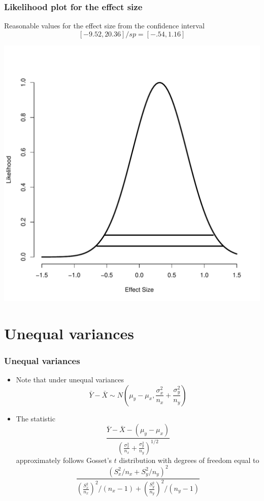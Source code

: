 \documentclass[aspectratio=169]{beamer}
\begin{document}
\begin{frame}\frametitle{Likelihood plot for the effect size}
Reasonable values for the effect size from the confidence interval
$$
[-9.52, 20.36] / sp = [-.54, 1.16]
$$
\begin{center}
\includegraphics[scale=.3]{Lecture10ESlikelihood.pdf}
\end{center}
\end{frame}


\section{Unequal variances}
\begin{frame}\frametitle{Unequal variances}
  \begin{itemize}
  \item Note that under unequal variances
    $$
    \bar Y - \bar X \sim N\left(\mu_y - \mu_x, \frac{\sigma_x^2}{n_x} + \frac{\sigma_y^2}{n_y}\right)
    $$
  \item The statistic 
    $$
    \frac{\bar Y - \bar X - (\mu_y - \mu_x)}{\left(\frac{\sigma_x^2}{n_x} + \frac{\sigma_y^2}{n_y}\right)^{1/2}}
    $$
    approximately follows Gosset's $t$ distribution with degrees of freedom equal to
    $$
    \frac{\left(S_x^2 / n_x + S_y^2/n_y\right)^2}
    {\left(\frac{S_x^2}{n_x}\right)^2 / (n_x - 1) +
      \left(\frac{S_y^2}{n_y}\right)^2 / (n_y - 1)}
    $$
  \end{itemize}
\end{frame}
\end{document}
